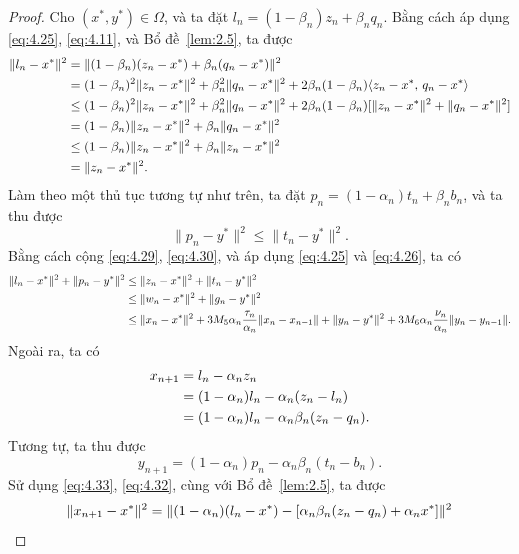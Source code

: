 \documentclass{MyBook}
\theoremstyle{plain}
\theoremstyle{definition}
\theoremstyle{remark}
\numberwithin{equation}{chapter}
\newcommand{\inp}[2]{\langle #1,\,#2\rangle}
\newcommand{\nm}[1]{\lVert #1\rVert}
\begin{document}
\begin{proof}
Cho $(x^{*},y^{*})\in\Omega$, và ta đặt $l_n=(1-\beta_n)z_n+\beta_n q_n$. Bằng cách áp dụng \eqref{eq:4.25}, \eqref{eq:4.11}, và Bổ đề~\ref{lem:2.5}, ta được
\begin{align}
\nm{l_n-x^{*}}^2 &= \nm{(1-\beta_n)(z_n-x^{*})+\beta_n(q_n-x^{*})}^2\notag\\
&= (1-\beta_n)^2\nm{z_n-x^{*}}^2+\beta_n^2\nm{q_n-x^{*}}^2+2\beta_n(1-\beta_n)\inp{z_n-x^{*}}{q_n-x^{*}}\notag\\
&\le (1-\beta_n)^2\nm{z_n-x^{*}}^2+\beta_n^2\nm{q_n-x^{*}}^2+2\beta_n(1-\beta_n)[\nm{z_n-x^{*}}^2+\nm{q_n-x^{*}}^2]\notag\\
&= (1-\beta_n)\nm{z_n-x^{*}}^2+\beta_n\nm{q_n-x^{*}}^2\notag\\
&\le (1-\beta_n)\nm{z_n-x^{*}}^2+\beta_n\nm{z_n-x^{*}}^2\notag\\
&= \nm{z_n-x^{*}}^2. \label{eq:4.29}
\end{align}
Làm theo một thủ tục tương tự như trên, ta đặt $p_n=(1-\alpha_n)t_n+\beta_n b_n$, và ta thu được
\begin{equation}
\nm{p_n-y^{*}}^2\le\nm{t_n-y^{*}}^2. \label{eq:4.30}
\end{equation}
Bằng cách cộng \eqref{eq:4.29}, \eqref{eq:4.30}, và áp dụng \eqref{eq:4.25} và \eqref{eq:4.26}, ta có
\begin{align}
\nm{l_n-x^{*}}^2+\nm{p_n-y^{*}}^2 &\le \nm{z_n-x^{*}}^2+\nm{t_n-y^{*}}^2\notag\\
&\le \nm{w_n-x^{*}}^2+\nm{g_n-y^{*}}^2\notag\\
&\le \nm{x_n-x^{*}}^2+3M_5\alpha_n\frac{\tau_n}{\alpha_n}\nm{x_n-x_{n-1}}+\nm{y_n-y^{*}}^2+3M_6\alpha_n\frac{\nu_n}{\alpha_n}\nm{y_n-y_{n-1}}. \label{eq:4.31}
\end{align}
Ngoài ra, ta có
\begin{align}
x_{n+1} &= l_n-\alpha_n z_n\notag\\
&= (1-\alpha_n)l_n-\alpha_n(z_n-l_n)\notag\\
&= (1-\alpha_n)l_n-\alpha_n\beta_n(z_n-q_n). \label{eq:4.32}
\end{align}
Tương tự, ta thu được
\begin{equation}
y_{n+1}=(1-\alpha_n)p_n-\alpha_n\beta_n(t_n-b_n). \label{eq:4.33}
\end{equation}
Sử dụng \eqref{eq:4.33}, \eqref{eq:4.32}, cùng với Bổ đề~\ref{lem:2.5}, ta được
\begin{align}
\nm{x_{n+1}-x^{*}}^2 &= \nm{(1-\alpha_n)(l_n-x^{*})-[\alpha_n\beta_n(z_n-q_n)+\alpha_n x^{*}]}^2\notag\\

\end{align}
\end{proof}
\end{document}
